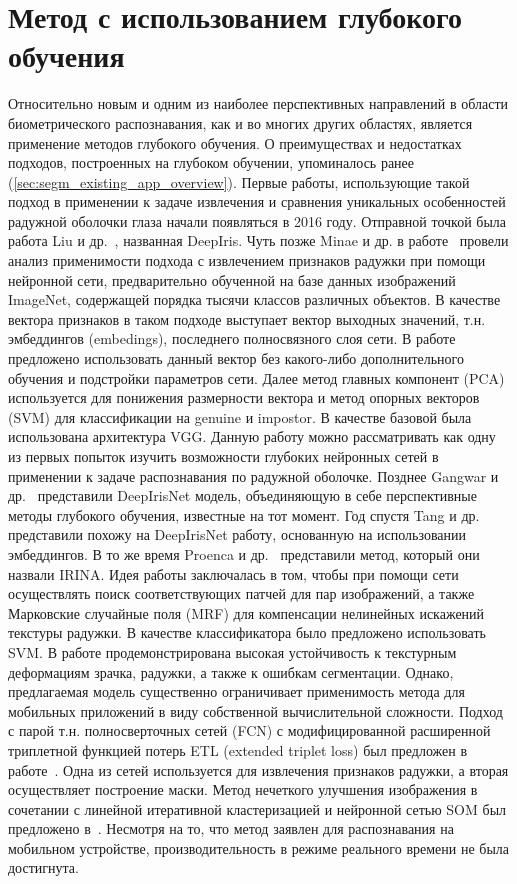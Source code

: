 \section{Метод с использованием глубокого обучения}
\label{sec:fem-deep}

Относительно новым и одним из наиболее перспективных направлений в области биометрического распознавания, как и во многих других областях, является применение методов глубокого обучения. О преимуществах и недостатках подходов, построенных на глубоком обучении, упоминалось ранее (\ref{sec:segm_existing_app_overview}). Первые работы, использующие такой подход в применении к задаче извлечения и сравнения уникальных особенностей радужной оболочки глаза начали появляться в 2016 году. Отправной точкой была работа Liu и др.~\cite{liu_2016_di}, названная DeepIris. Чуть позже Minae и др. в работе~\cite{minaee_2016} провели анализ применимости подхода с извлечением признаков радужки при помощи нейронной сети, предварительно обученной на базе данных изображений ImageNet, содержащей порядка тысячи классов различных объектов. В качестве вектора признаков в таком подходе выступает вектор выходных значений, т.н. эмбеддингов (embedings), последнего полносвязного слоя сети. В работе предложено использовать данный вектор без какого-либо дополнительного обучения и подстройки параметров сети. Далее метод главных компонент (PCA) используется для понижения размерности вектора и метод опорных векторов (SVM) для классификации на genuine и impostor. В качестве базовой была использована архитектура VGG. Данную работу можно рассматривать как одну из первых попыток изучить возможности глубоких нейронных сетей в применении к задаче распознавания по радужной оболочке. Позднее Gangwar и др.~\cite{gangwar_2016} представили DeepIrisNet модель, объединяющую в себе перспективные методы глубокого обучения, известные на тот момент. Год спустя Tang и др.~\cite{tang_2017} представили похожу на DeepIrisNet работу, основанную на использовании эмбеддингов. В то же время Proenca и др.~\cite{proenca_2017} представили метод, который они назвали IRINA. Идея работы заключалась в том, чтобы при помощи сети осуществлять поиск соответствующих патчей для пар изображений, а также Марковские случайные поля (MRF) для компенсации нелинейных искажений текстуры радужки. В качестве классификатора было предложено использовать SVM. В работе продемонстрирована высокая устойчивость к текстурным деформациям зрачка, радужки, а также к ошибкам сегментации. Однако, предлагаемая модель существенно ограничивает применимость метода для мобильных приложений в виду собственной вычислительной сложности. Подход с парой т.н. полносверточных сетей (FCN) с модифицированной расширенной триплетной функцией потерь ETL (extended triplet loss) был предложен в работе~\cite{zhao_2017}. Одна из сетей используется для извлечения признаков радужки, а вторая осуществляет построение маски. Метод нечеткого улучшения изображения в сочетании с линейной итеративной кластеризацией и нейронной сетью SOM был предложено в~\cite{abate_2017}. Несмотря на то, что метод заявлен для распознавания на мобильном устройстве, производительность в режиме реального времени не была достигнута.

